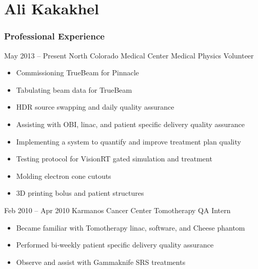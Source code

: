 \documentclass{tccv-grey}
\begin{document}
\small
\part{Ali Kakakhel}

\section{Professional Experience}
\begin{eventlist}
    \item{May 2013 -- Present}
         {North Colorado Medical Center}
         {Medical Physics Volunteer}
\end{eventlist}
\vspace{-\topsep}
\begin{itemize}[noitemsep]
    \item Commissioning TrueBeam for Pinnacle
    \item Tabulating beam data for TrueBeam
    \item HDR source swapping and daily quality assurance
    \item Assisting with OBI, linac, and patient specific delivery quality assurance
    \item Implementing a system to quantify and improve treatment plan quality
    \item Testing protocol for VisionRT gated simulation and treatment
    \item Molding electron cone cutouts
    \item 3D printing bolus and patient structures\\
\end{itemize}

\begin{eventlist}
    \item{Feb 2010 -- Apr 2010}
         {Karmanos Cancer Center}
         {Tomotherapy QA Intern}
\end{eventlist}
\vspace{-\topsep}
\begin{itemize}[noitemsep]
    \item Became familiar with Tomotherapy linac, software, and Cheese phantom
    \item Performed bi-weekly patient specific delivery quality assurance
    \item Observe and assist with Gammaknife SRS treatments\\
\end{itemize}
\end{document}
